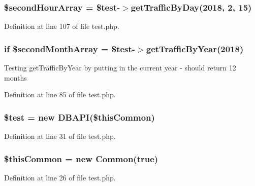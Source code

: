 \subsubsection[{\$second\+Hour\+Array}]{\setlength{\rightskip}{0pt plus 5cm}\$second\+Hour\+Array = \$test-\/$>$get\+Traffic\+By\+Day(2018, 2, 15)}\label{test_8php_a1d19ca72f1f9b19ab4d0107dec987a79}


Definition at line 107 of file test.\+php.

\subsubsection[{\$second\+Month\+Array}]{\setlength{\rightskip}{0pt plus 5cm}if \$second\+Month\+Array = \$test-\/$>$get\+Traffic\+By\+Year(2018)}\label{test_8php_a056500060fa87796ceb5c1d9c6e1502e}
Testing get\+Traffic\+By\+Year by putting in the current year -\/ should return 12 months 

Definition at line 85 of file test.\+php.

\subsubsection[{\$test}]{\setlength{\rightskip}{0pt plus 5cm}\$test = new {\bf D\+B\+A\+PI}(\$this\+Common)}\label{test_8php_a31daebf88fc668f410293e2c70cea3fc}


Definition at line 31 of file test.\+php.

\subsubsection[{\$this\+Common}]{\setlength{\rightskip}{0pt plus 5cm}\$this\+Common = new {\bf Common}(true)}\label{test_8php_a2dc37683cec5a169d791007363950944}


Definition at line 26 of file test.\+php.

